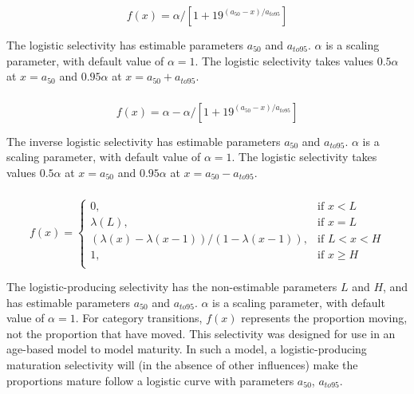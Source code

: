 \begin{equation}
  f(x) = \alpha / [1+19^{(a_{50}-x)/a_{to95}}]
\end{equation}

The logistic selectivity has estimable parameters $a_{50}$ and $a_{to95}$. $\alpha$ is a scaling parameter, with default value of $\alpha = 1$. The logistic selectivity takes values $0.5 \alpha$ at $x=a_{50}$ and $0.95 \alpha$ at $x=a_{50}+a_{to95}$.

\subsubsection[Inverse logistic]{}

\begin{equation}
  f(x) = \alpha - \alpha / [1+19^{(a_{50}-x)/a_{to95}}]
\end{equation}

The inverse logistic selectivity has estimable parameters $a_{50}$ and $a_{to95}$. $\alpha$ is a scaling parameter, with default value of $\alpha = 1$. The logistic selectivity takes values $0.5 \alpha$ at $x=a_{50}$ and $0.95 \alpha$ at $x=a_{50}-a_{to95}$.

\subsubsection[Logistic producing]{}

\begin{equation}
f(x)=\begin{cases}
	  0, & \text{if $x < L$} \\
	  \lambda(L), & \text{if $x=L$} \\
	  \left( \lambda(x)-\lambda(x-1) \right) / \left( 1-\lambda(x-1) \right), & \text{if $L < x < H$} \\
	  1, & \text{if $x \ge H$} \\
  \end{cases}
\end{equation}

The logistic-producing selectivity has the non-estimable parameters $L$ and $H$, and has estimable parameters $a_{50}$ and $a_{to95}$. $\alpha$ is a scaling parameter, with default value of $\alpha = 1$. For category transitions, $f(x)$ represents the proportion moving, not the proportion that have moved. This selectivity was designed for use in an age-based model to model maturity. In such a model, a logistic-producing maturation selectivity will (in the absence of other influences) make the proportions mature follow a logistic curve with parameters $a_{50}$, $a_{to95}$.

